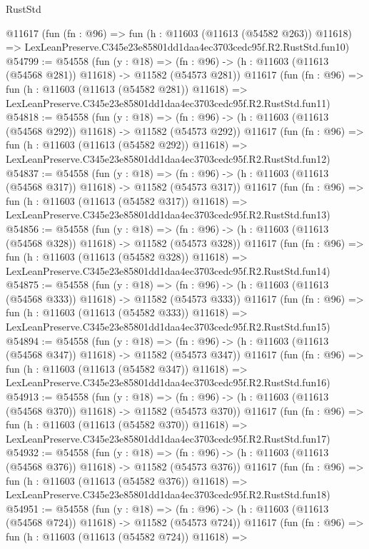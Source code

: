 \begin{lexlean}{RustStd}
\begin{coremodule}
    @11617
    (fun (fn : @96) =>
    fun (h : @11603 (@11613 (@54582 @263)) @11618) =>
    LexLeanPreserve.C345e23e85801dd1daa4ec3703cedc95f.R2.RustStd.fun10)
@54799 := @54558
    (fun (y : @18) =>
    (fn : @96) -> (h : @11603 (@11613 (@54568 @281)) @11618) -> @11582 (@54573 @281))
    @11617
    (fun (fn : @96) =>
    fun (h : @11603 (@11613 (@54582 @281)) @11618) =>
    LexLeanPreserve.C345e23e85801dd1daa4ec3703cedc95f.R2.RustStd.fun11)
@54818 := @54558
    (fun (y : @18) =>
    (fn : @96) -> (h : @11603 (@11613 (@54568 @292)) @11618) -> @11582 (@54573 @292))
    @11617
    (fun (fn : @96) =>
    fun (h : @11603 (@11613 (@54582 @292)) @11618) =>
    LexLeanPreserve.C345e23e85801dd1daa4ec3703cedc95f.R2.RustStd.fun12)
@54837 := @54558
    (fun (y : @18) =>
    (fn : @96) -> (h : @11603 (@11613 (@54568 @317)) @11618) -> @11582 (@54573 @317))
    @11617
    (fun (fn : @96) =>
    fun (h : @11603 (@11613 (@54582 @317)) @11618) =>
    LexLeanPreserve.C345e23e85801dd1daa4ec3703cedc95f.R2.RustStd.fun13)
@54856 := @54558
    (fun (y : @18) =>
    (fn : @96) -> (h : @11603 (@11613 (@54568 @328)) @11618) -> @11582 (@54573 @328))
    @11617
    (fun (fn : @96) =>
    fun (h : @11603 (@11613 (@54582 @328)) @11618) =>
    LexLeanPreserve.C345e23e85801dd1daa4ec3703cedc95f.R2.RustStd.fun14)
@54875 := @54558
    (fun (y : @18) =>
    (fn : @96) -> (h : @11603 (@11613 (@54568 @333)) @11618) -> @11582 (@54573 @333))
    @11617
    (fun (fn : @96) =>
    fun (h : @11603 (@11613 (@54582 @333)) @11618) =>
    LexLeanPreserve.C345e23e85801dd1daa4ec3703cedc95f.R2.RustStd.fun15)
@54894 := @54558
    (fun (y : @18) =>
    (fn : @96) -> (h : @11603 (@11613 (@54568 @347)) @11618) -> @11582 (@54573 @347))
    @11617
    (fun (fn : @96) =>
    fun (h : @11603 (@11613 (@54582 @347)) @11618) =>
    LexLeanPreserve.C345e23e85801dd1daa4ec3703cedc95f.R2.RustStd.fun16)
@54913 := @54558
    (fun (y : @18) =>
    (fn : @96) -> (h : @11603 (@11613 (@54568 @370)) @11618) -> @11582 (@54573 @370))
    @11617
    (fun (fn : @96) =>
    fun (h : @11603 (@11613 (@54582 @370)) @11618) =>
    LexLeanPreserve.C345e23e85801dd1daa4ec3703cedc95f.R2.RustStd.fun17)
@54932 := @54558
    (fun (y : @18) =>
    (fn : @96) -> (h : @11603 (@11613 (@54568 @376)) @11618) -> @11582 (@54573 @376))
    @11617
    (fun (fn : @96) =>
    fun (h : @11603 (@11613 (@54582 @376)) @11618) =>
    LexLeanPreserve.C345e23e85801dd1daa4ec3703cedc95f.R2.RustStd.fun18)
@54951 := @54558
    (fun (y : @18) =>
    (fn : @96) -> (h : @11603 (@11613 (@54568 @724)) @11618) -> @11582 (@54573 @724))
    @11617
    (fun (fn : @96) =>
    fun (h : @11603 (@11613 (@54582 @724)) @11618) =>

\end{coremodule}
\end{lexlean}
